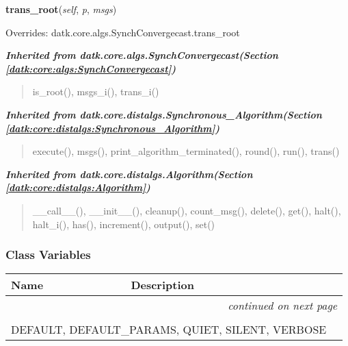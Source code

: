     \vspace{0.5ex}

\hspace{.8\funcindent}\begin{boxedminipage}{\funcwidth}

    \raggedright \textbf{trans\_root}(\textit{self}, \textit{p}, \textit{msgs})

\setlength{\parskip}{2ex}
\setlength{\parskip}{1ex}
      Overrides: datk.core.algs.SynchConvergecast.trans\_root

    \end{boxedminipage}


\large{\textbf{\textit{Inherited from datk.core.algs.SynchConvergecast\textit{(Section \ref{datk:core:algs:SynchConvergecast})}}}}

\begin{quote}
is\_root(), msgs\_i(), trans\_i()
\end{quote}

\large{\textbf{\textit{Inherited from datk.core.distalgs.Synchronous\_Algorithm\textit{(Section \ref{datk:core:distalgs:Synchronous_Algorithm})}}}}

\begin{quote}
execute(), msgs(), print\_algorithm\_terminated(), round(), run(), trans()
\end{quote}

\large{\textbf{\textit{Inherited from datk.core.distalgs.Algorithm\textit{(Section \ref{datk:core:distalgs:Algorithm})}}}}

\begin{quote}
\_\_call\_\_(), \_\_init\_\_(), cleanup(), count\_msg(), delete(), get(), halt(), halt\_i(), has(), increment(), output(), set()
\end{quote}


  \subsubsection{Class Variables}

    \vspace{-1cm}
\hspace{\varindent}\begin{longtable}{|p{\varnamewidth}|p{\vardescrwidth}|l}
\cline{1-2}
\cline{1-2} \centering \textbf{Name} & \centering \textbf{Description}& \\
\cline{1-2}
\endhead\cline{1-2}\multicolumn{3}{r}{\small\textit{continued on next page}}\\\endfoot\cline{1-2}
\endlastfoot\multicolumn{2}{|l|}{\textit{Inherited from datk.core.distalgs.Algorithm \textit{(Section \ref{datk:core:distalgs:Algorithm})}}}\\
\multicolumn{2}{|p{\varwidth}|}{\raggedright DEFAULT, DEFAULT\_PARAMS, QUIET, SILENT, VERBOSE}\\
\cline{1-2}
\end{longtable}

